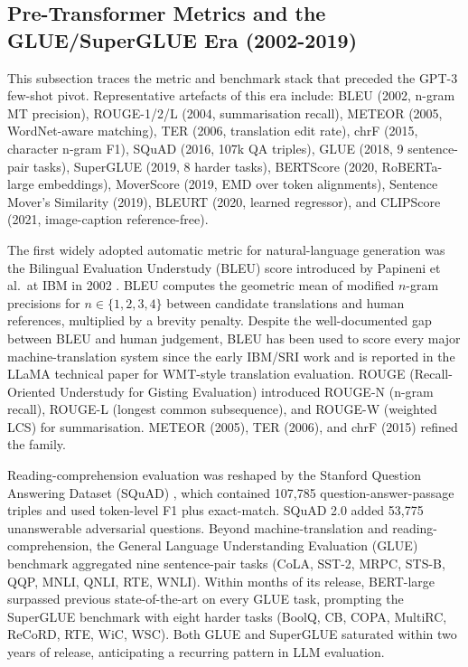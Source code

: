 \documentclass{article}
\begin{document}
\subsection{Pre-Transformer Metrics and the GLUE/SuperGLUE Era (2002-2019)}\label{pre-transformer-metrics-and-the-gluesuperglue-era-2002-2019}

This subsection traces the metric and benchmark stack that preceded the GPT-3 few-shot pivot. Representative artefacts of this era include: BLEU (2002, n-gram MT precision), ROUGE-1/2/L (2004, summarisation recall), METEOR (2005, WordNet-aware matching), TER (2006, translation edit rate), chrF (2015, character n-gram F1), SQuAD (2016, 107k QA triples), GLUE (2018, 9 sentence-pair tasks), SuperGLUE (2019, 8 harder tasks), BERTScore (2020, RoBERTa-large embeddings), MoverScore (2019, EMD over token alignments), Sentence Mover's Similarity (2019), BLEURT (2020, learned regressor), and CLIPScore (2021, image-caption reference-free).

The first widely adopted automatic metric for natural-language generation was the Bilingual Evaluation Understudy (BLEU) score introduced by Papineni et al.~at IBM in 2002 \cite{papineni2002bleuamethodforauto}. BLEU computes the geometric mean of modified \(n\)-gram precisions for \(n \in \{1, 2, 3, 4\}\) between candidate translations and human references, multiplied by a brevity penalty. Despite the well-documented gap between BLEU and human judgement, BLEU has been used to score every major machine-translation system since the early IBM/SRI work and is reported in the LLaMA technical paper \cite{touvron20232023} for WMT-style translation evaluation. ROUGE (Recall-Oriented Understudy for Gisting Evaluation) \cite{lin2004rougeapackageforau} introduced ROUGE-N (n-gram recall), ROUGE-L (longest common subsequence), and ROUGE-W (weighted LCS) for summarisation. METEOR (2005), TER (2006), and chrF (2015) refined the family.

Reading-comprehension evaluation was reshaped by the Stanford Question Answering Dataset (SQuAD) \cite{rajpurkar2016squad100000questio}, which contained 107,785 question-answer-passage triples and used token-level F1 plus exact-match. SQuAD 2.0 added 53,775 unanswerable adversarial questions. Beyond machine-translation and reading-comprehension, the General Language Understanding Evaluation (GLUE) benchmark \cite{wang2018glueamultitaskbenc} aggregated nine sentence-pair tasks (CoLA, SST-2, MRPC, STS-B, QQP, MNLI, QNLI, RTE, WNLI). Within months of its release, BERT-large \cite{devlin2019bertpretrainingofd} surpassed previous state-of-the-art on every GLUE task, prompting the SuperGLUE benchmark \cite{wang2019superglueastickier} with eight harder tasks (BoolQ, CB, COPA, MultiRC, ReCoRD, RTE, WiC, WSC). Both GLUE and SuperGLUE saturated within two years of release, anticipating a recurring pattern in LLM evaluation.
\end{document}
